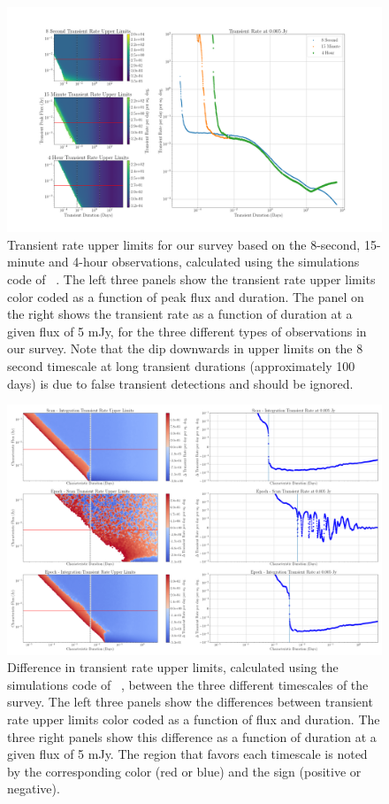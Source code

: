 \documentclass[12pt]{article}
\begin{document}
\begin{landscape}
\begin{figure}
	\includegraphics[width=1.1\textwidth]{allplots.png}
	\caption{Transient rate upper limits for our survey based on the 8-second, 15-minute and 4-hour observations, calculated using the simulations code of ~\citet{2022ascl.soft04007C}. The left three panels show the transient rate upper limits color coded as a function of peak flux and duration. The panel on the right shows the transient rate as a function of duration at a given flux of 5 mJy, for the three different types of observations in our survey. Note that the dip downwards in upper limits on the 8 second timescale at long transient durations (approximately 100 days) is due to false transient detections and should be ignored.}
	\label{fig:threelimits}
\end{figure}

\begin{figure}
	\includegraphics[width=1\textwidth]{diffplots.png}
	\caption{Difference in transient rate upper limits, calculated using the simulations code of ~\citet{2022ascl.soft04007C}, between the three different timescales of the survey. The left three panels show the differences between transient rate upper limits color coded as a function of flux and duration. The three right panels show this difference as a function of duration at a given flux of 5 mJy. The region that favors each timescale is noted by the corresponding color (red or blue) and the sign (positive or negative).}
	\label{fig:threediff}
\end{figure}

\end{landscape}
\restoregeometry
 \doublespacing
\end{document}
